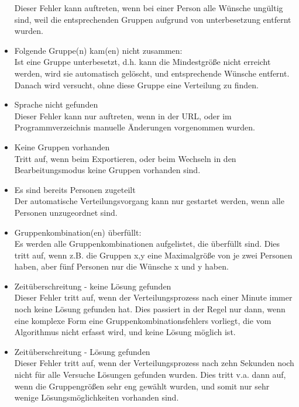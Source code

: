 \documentclass[a4paper,11pt]{article}
\begin{document}
\begin{itemize}
    Dieser Fehler kann auftreten, wenn bei einer Person alle Wünsche ungültig sind, weil die entsprechenden Gruppen aufgrund von unterbesetzung entfernt wurden.
    \item Folgende Gruppe(n) kam(en) nicht zusammen: \\
    Ist eine Gruppe unterbesetzt, d.h. kann die Mindestgröße nicht erreicht werden, wird sie automatisch gelöscht, und entsprechende Wünsche entfernt. Danach wird versucht, ohne diese Gruppe eine Verteilung zu finden.
    \item Sprache nicht gefunden \\
    Dieser Fehler kann nur auftreten, wenn in der URL, oder im Programmverzeichnis manuelle Änderungen vorgenommen wurden.
    \item Keine Gruppen vorhanden \\
    Tritt auf, wenn beim Exportieren, oder beim Wechseln in den Bearbeitungsmodus keine Gruppen vorhanden sind.
    \item Es sind bereits Personen zugeteilt \\
    Der automatische Verteilungsvorgang kann nur gestartet werden, wenn alle Personen unzugeordnet sind.
    \item Gruppenkombination(en) überfüllt: \\
    Es werden alle Gruppenkombinationen aufgelistet, die überfüllt sind. Dies tritt auf, wenn z.B. die Gruppen x,y eine Maximalgröße von je zwei Personen haben, aber fünf Personen nur die Wünsche x und y haben.
    \item Zeitüberschreitung - keine Lösung gefunden \\
    Dieser Fehler tritt auf, wenn der Verteilungsprozess nach einer Minute immer noch keine Lösung gefunden hat. Dies passiert in der Regel nur dann, wenn eine komplexe Form eine Gruppenkombinationsfehlers vorliegt, die vom Algorithmus nicht erfasst wird, und keine Lösung möglich ist.
    \item Zeitüberschreitung - Lösung gefunden \\
    Dieser Fehler tritt auf, wenn der Verteilungsprozess nach zehn Sekunden noch nicht für alle Versuche Lösungen gefunden wurden. Dies tritt v.a. dann auf, wenn die Gruppengrößen sehr eng gewählt wurden, und somit nur sehr wenige Lösungsmöglichkeiten vorhanden sind.
\end{itemize}
\end{document}
